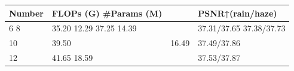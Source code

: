 \begin{tabular}{llll}
\toprule
Number & FLOPs (G) \#Params (M) &  & PSNR↑(rain/haze) \\
\midrule
6 8 & 35.20 12.29 37.25 14.39 &  & 37.31/37.65 37.38/37.73 \\
10 & 39.50 & 16.49 & 37.49/37.86 \\
12 & 41.65 18.59 &  & 37.53/37.87 \\
\bottomrule
\end{tabular}
